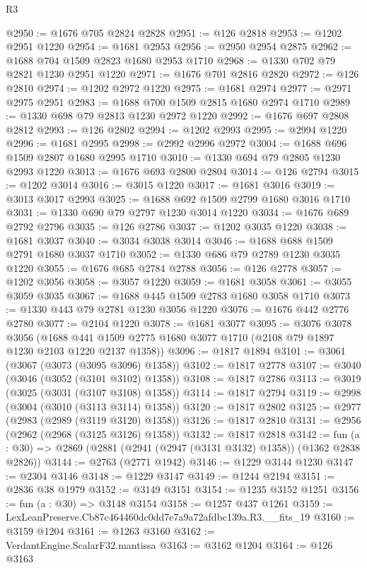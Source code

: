 \begin{lexlean}{R3}
\begin{coremodule}
@2950 := @1676 @705 @2824 @2828
@2951 := @126 @2818
@2953 := @1202 @2951 @1220
@2954 := @1681 @2953
@2956 := @2950 @2954 @2875
@2962 := @1688 @704 @1509 @2823 @1680 @2953 @1710
@2968 := @1330 @702 @79 @2821 @1230 @2951 @1220
@2971 := @1676 @701 @2816 @2820
@2972 := @126 @2810
@2974 := @1202 @2972 @1220
@2975 := @1681 @2974
@2977 := @2971 @2975 @2951
@2983 := @1688 @700 @1509 @2815 @1680 @2974 @1710
@2989 := @1330 @698 @79 @2813 @1230 @2972 @1220
@2992 := @1676 @697 @2808 @2812
@2993 := @126 @2802
@2994 := @1202 @2993
@2995 := @2994 @1220
@2996 := @1681 @2995
@2998 := @2992 @2996 @2972
@3004 := @1688 @696 @1509 @2807 @1680 @2995 @1710
@3010 := @1330 @694 @79 @2805 @1230 @2993 @1220
@3013 := @1676 @693 @2800 @2804
@3014 := @126 @2794
@3015 := @1202 @3014
@3016 := @3015 @1220
@3017 := @1681 @3016
@3019 := @3013 @3017 @2993
@3025 := @1688 @692 @1509 @2799 @1680 @3016 @1710
@3031 := @1330 @690 @79 @2797 @1230 @3014 @1220
@3034 := @1676 @689 @2792 @2796
@3035 := @126 @2786
@3037 := @1202 @3035 @1220
@3038 := @1681 @3037
@3040 := @3034 @3038 @3014
@3046 := @1688 @688 @1509 @2791 @1680 @3037 @1710
@3052 := @1330 @686 @79 @2789 @1230 @3035 @1220
@3055 := @1676 @685 @2784 @2788
@3056 := @126 @2778
@3057 := @1202 @3056
@3058 := @3057 @1220
@3059 := @1681 @3058
@3061 := @3055 @3059 @3035
@3067 := @1688 @445 @1509 @2783 @1680 @3058 @1710
@3073 := @1330 @443 @79 @2781 @1230 @3056 @1220
@3076 := @1676 @442 @2776 @2780
@3077 := @2104 @1220
@3078 := @1681 @3077
@3095 := @3076
    @3078
    @3056
    (@1688 @441 @1509 @2775 @1680 @3077 @1710 (@2108 @79 @1897 @1230 @2103 @1220 @2137 @1358))
@3096 := @1817 @1894
@3101 := @3061 (@3067 (@3073 (@3095 @3096) @1358))
@3102 := @1817 @2778
@3107 := @3040 (@3046 (@3052 (@3101 @3102) @1358))
@3108 := @1817 @2786
@3113 := @3019 (@3025 (@3031 (@3107 @3108) @1358))
@3114 := @1817 @2794
@3119 := @2998 (@3004 (@3010 (@3113 @3114) @1358))
@3120 := @1817 @2802
@3125 := @2977 (@2983 (@2989 (@3119 @3120) @1358))
@3126 := @1817 @2810
@3131 := @2956 (@2962 (@2968 (@3125 @3126) @1358))
@3132 := @1817 @2818
@3142 := fun (a : @30) => @2869 (@2881 (@2941 (@2947 (@3131 @3132) @1358)) (@1362 @2838 @2826))
@3144 := @2763 (@2771 @1942)
@3146 := @1229 @3144 @1230
@3147 := @2304 @3146
@3148 := @1229 @3147
@3149 := @1244 @2194
@3151 := @2836 @38 @1979
@3152 := @3149 @3151
@3154 := @1235 @3152 @1251
@3156 := fun (a : @30) => @3148 @3154
@3158 := @1257 @437 @1261
@3159 := LexLeanPreserve.Cb87c464460dc0dd7e7a9a72afdbc139a.R3.__fits_19
@3160 := @3159 @1204
@3161 := @1263 @3160
@3162 := VerdantEngine.ScalarF32.mantissa
@3163 := @3162 @1204
@3164 := @126 @3163

\end{coremodule}
\end{lexlean}
